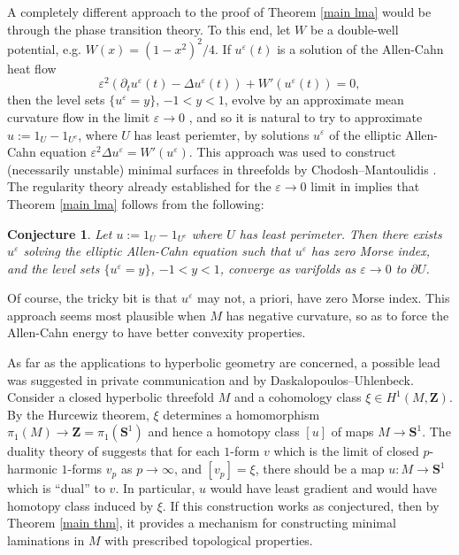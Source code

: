 \documentclass[reqno,10pt]{amsart}
\newcommand{\ZZ}{\mathbf{Z}}
\newcommand{\Sph}{\mathbf S}
\newtheorem{conjecture}[theorem]{Conjecture}
\theoremstyle{definition}
\numberwithin{equation}{section}
\begin{document}
A completely different approach to the proof of Theorem \ref{main lma} would be through the phase transition theory. 
To this end, let $W$ be a double-well potential, e.g. $W(x) = (1 - x^2)^2/4$.
If $u^\varepsilon(t)$ is a solution of the Allen-Cahn heat flow
$$\varepsilon^2(\partial_t u^\varepsilon(t) - \Delta u^\varepsilon(t)) + W'(u^\varepsilon(t)) = 0,$$
then the level sets $\{u^\varepsilon = y\}$, $-1 < y < 1$, evolve by an approximate mean curvature flow in the limit $\varepsilon \to 0$ \cite{Guaraco}, and so it is natural to try to approximate $u := 1_U - 1_{U^c}$, where $U$ has least periemter, by solutions $u^\varepsilon$ of the elliptic Allen-Cahn equation $\varepsilon^2 \Delta u^\varepsilon = W'(u^\varepsilon)$.
This approach was used to construct (necessarily unstable) minimal surfaces in threefolds by Chodosh--Mantoulidis \cite{Chodosh_2020}.
The regularity theory already established for the $\varepsilon \to 0$ limit in \cite[Appendix B]{Guaraco} implies that Theorem \ref{main lma} follows from the following:

\begin{conjecture}
Let $u := 1_U - 1_{U^c}$ where $U$ has least perimeter. Then there exists $u^\varepsilon$ solving the elliptic Allen-Cahn equation such that $u^\varepsilon$ has zero Morse index, and the level sets $\{u^\varepsilon = y\}$, $-1 < y < 1$, converge as varifolds as $\varepsilon \to 0$ to $\partial U$.
\end{conjecture}

Of course, the tricky bit is that $u^\varepsilon$ may not, a priori, have zero Morse index.
This approach seems most plausible when $M$ has negative curvature, so as to force the Allen-Cahn energy to have better convexity properties.

As far as the applications to hyperbolic geometry are concerned, a possible lead was suggested in private communication and \cite[Problem 9.11]{daskalopoulos2020transverse} by Daskalopoulos--Uhlenbeck.
Consider a closed hyperbolic threefold $M$ and a cohomology class $\xi \in H^1(M, \ZZ)$.
By the Hurcewiz theorem, $\xi$ determines a homomorphism $\pi_1(M) \to \ZZ = \pi_1(\Sph^1)$ and hence a homotopy class $[u]$ of maps $M \to \Sph^1$.
The duality theory of \cite{daskalopoulos2020transverse} suggests that for each $1$-form $v$ which is the limit of closed $p$-harmonic $1$-forms $v_p$
as $p \to \infty$, and $[v_p] = \xi$, there should be a map $u: M \to \Sph^1$ which is ``dual'' to $v$.
In particular, $u$ would have least gradient and would have homotopy class induced by $\xi$.
If this construction works as conjectured, then by Theorem \ref{main thm}, it provides a mechanism for constructing minimal laminations in $M$ with prescribed topological properties.
\end{document}
